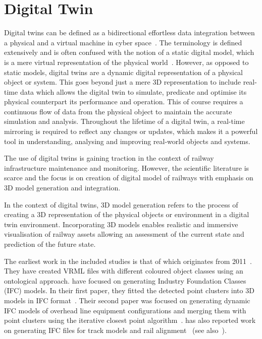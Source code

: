 \section{Digital Twin}\label{sec:stoa:digitaltwin}
Digital twins can be defined as a bidirectional effortless data integration between a physical and a virtual machine in cyber space~\cite{fuller2020digital}. The terminology is defined extensively and is often confused with the notion of a static digital model, which is a mere virtual representation of the physical world~\cite{fuller2020digital}. However, as opposed to static models, digital twins are a dynamic digital representation of a physical object or system. This goes beyond just a mere 3D representation to include real-time data which allows the digital twin to simulate, predicate and optimise its physical counterpart its performance and operation. This of course requires a continuous flow of data from the physical object to maintain the accurate simulation and analysis. Throughout the lifetime of a digital twin, a real-time mirroring is required to reflect any changes or updates, which makes it a powerful tool in understanding, analysing and improving real-world objects and systems.

The use of digital twins is gaining traction in the context of railway infrastructure maintenance and monitoring. However, the scientific literature is scarce and the focus is on creation of digital model of railways with emphasis on 3D model generation and integration. 

In the context of digital twins, 3D model generation refers to the process of creating a 3D representation of the physical objects or environment in a digital twin environment. Incorporating 3D models enables realistic and immersive visualisation of railway assets allowing an assessment of the current state and prediction of the future state. 

The earliest work in the included studies is that of \citeauthor{benhmida2011from} which originates from 2011~\cite{benhmida2011from}. They have created VRML files with different coloured object classes using an ontological approach. \citeauthor{ariyachandra2020detection} have focused on generating Industry Foundation Classes (IFC) models. In their first paper, they fitted the detected point clusters into 3D models in IFC format~\cite{ariyachandra2020detection}. Their second paper was focused on generating dynamic IFC models of overhead line equipment configurations and merging them with point clusters using the iterative closest point algorithm~\cite{ariyachandra2020digital}. \citeauthor{soilan2019review} has also reported work on generating IFC files for track models and rail alignment~\cite{soilan2019review} (see also~\cite{soilan20213D,soilan2021fully}).


